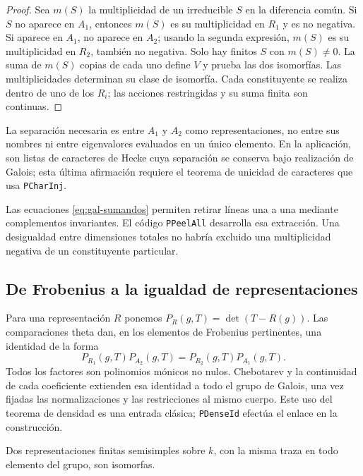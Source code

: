 \begin{proof}
Sea $m(S)$ la multiplicidad de un irreducible $S$ en la diferencia
común. Si $S$ no aparece en $A_1$, entonces $m(S)$ es su
multiplicidad en $R_1$ y es no negativa. Si aparece en $A_1$,
no aparece en $A_2$; usando la segunda expresión,
$m(S)$ es su multiplicidad en $R_2$, también no negativa.
Solo hay finitos $S$ con $m(S)\ne0$. La suma de $m(S)$ copias
de cada uno define $V$ y prueba las dos isomorfías.
Las multiplicidades determinan su clase de isomorfía.
Cada constituyente se realiza dentro de uno de los $R_i$;
las acciones restringidas y su suma finita son continuas.
\end{proof}

La separación necesaria es entre $A_1$ y $A_2$ como
representaciones, no entre sus nombres ni entre eigenvalores
evaluados en un único elemento. En la aplicación, son listas de
caracteres de Hecke cuya separación se conserva bajo realización
de Galois; esta última afirmación requiere el teorema de unicidad
de caracteres que usa \texttt{PCharInj}.

Las ecuaciones \eqref{eq:gal-sumandos} permiten retirar líneas
una a una mediante complementos invariantes.
El código \texttt{PPeelAll} desarrolla esa extracción.
Una desigualdad entre dimensiones totales no habría excluido
una multiplicidad negativa de un constituyente particular.

\subsection{De Frobenius a la igualdad de representaciones}
\label{subsec:gal-trazas}

Para una representación $R$ ponemos
$P_R(g,T)=\det(T-R(g))$. Las comparaciones theta dan, en los
elementos de Frobenius pertinentes, una identidad de la forma
\begin{equation}
 P_{R_1}(g,T)P_{A_2}(g,T)
     =P_{R_2}(g,T)P_{A_1}(g,T).
 \label{eq:gal-productos}
\end{equation}
Todos los factores son polinomios mónicos no nulos.
Chebotarev y la continuidad de cada coeficiente extienden esa
identidad a todo el grupo de Galois, una vez fijadas las
normalizaciones y las restricciones al mismo cuerpo.
Este uso del teorema de densidad es una entrada clásica;
\texttt{PDenseId} efectúa el enlace en la construcción.

\begin{lema}
\label{lem:gal-trazas}
Dos representaciones finitas semisimples sobre $k$, con la misma
traza en todo elemento del grupo, son isomorfas.
\end{lema}

